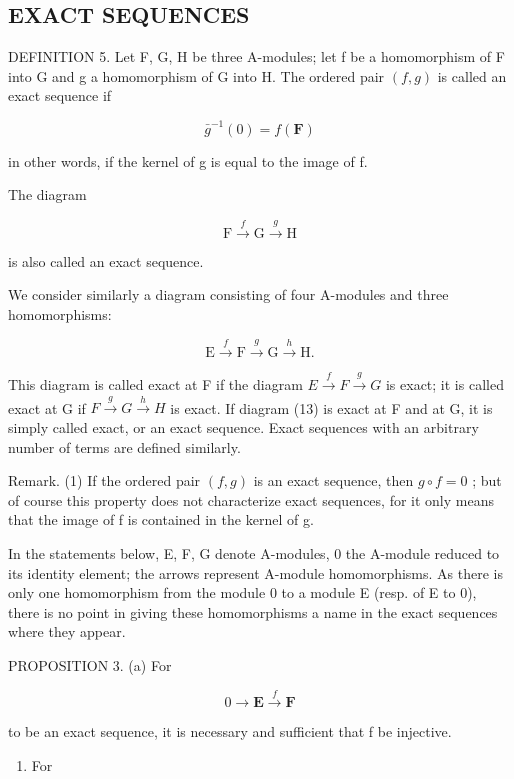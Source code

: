 \subsection{EXACT SEQUENCES}

DEFINITION 5. Let F, G, H be three A-modules; let f be a homomorphism of F into G and g a homomorphism of G into H. The ordered pair \((f, g)\) is called an exact sequence if

\[
\bar {g} ^ {- 1} (0) = f (\mathbf {F})
\]

in other words, if the kernel of g is equal to the image of f.

The diagram

\[
\mathrm{F} \xrightarrow {f} \mathrm{G} \xrightarrow {g} \mathrm{H}\tag{12}
\]

is also called an exact sequence.

We consider similarly a diagram consisting of four A-modules and three homomorphisms:

\[
\mathrm{E} \xrightarrow {f} \mathrm{F} \xrightarrow {g} \mathrm{G} \xrightarrow {h} \mathrm{H}.\tag{13}
\]

This diagram is called exact at F if the diagram \(E \xrightarrow{f} F \xrightarrow{g} G\) is exact; it is called exact at G if \(F \xrightarrow{g} G \xrightarrow{h} H\) is exact. If diagram (13) is exact at F and at G, it is simply called exact, or an exact sequence. Exact sequences with an arbitrary number of terms are defined similarly.

Remark. (1) If the ordered pair \((f, g)\) is an exact sequence, then \(g \circ f = 0\) ; but of course this property does not characterize exact sequences, for it only means that the image of f is contained in the kernel of g.

In the statements below, E, F, G denote A-modules, 0 the A-module reduced to its identity element; the arrows represent A-module homomorphisms. As there is only one homomorphism from the module 0 to a module E (resp. of E to 0), there is no point in giving these homomorphisms a name in the exact sequences where they appear.

PROPOSITION 3. (a) For

\[
0 \longrightarrow \mathbf {E} \stackrel {f} {\longrightarrow} \mathbf {F}
\]

to be an exact sequence, it is necessary and sufficient that f be injective.

\begin{enumerate}
\def\labelenumi{(\alph{enumi})}
\setcounter{enumi}{1}
\tightlist
\item
  For
\end{enumerate}

